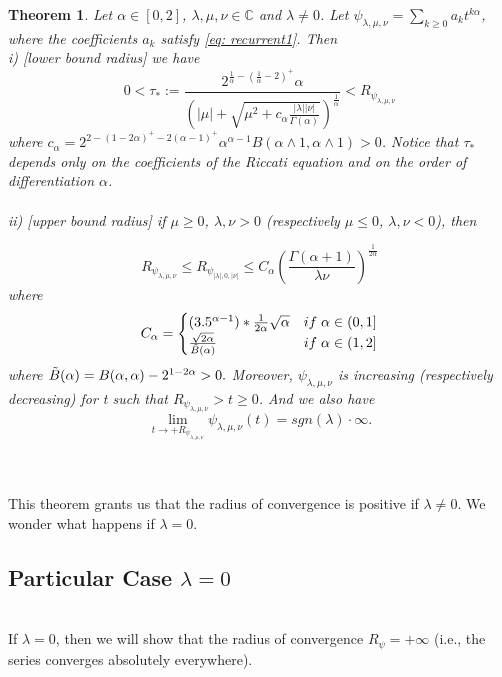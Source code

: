\documentclass[a4paper,italian,11pt]{book}
\newtheorem{theorem}{Theorem}
\theoremstyle{plain}
\theoremstyle{remark}
\theoremstyle{plain}
\begin{document}
\begin{theorem}\label{th: importantTheorem}
Let $\alpha \in [0,2]$, $\lambda, \mu, \nu \in \mathbb{C}$ and $\lambda \ne 0$. Let $\psi_{\lambda, \mu , \nu} = \sum_{k\ge 0} a_k t^{k\alpha}$, where the coefficients $a_k$ satisfy \eqref{eq: recurrent1}. Then
\\
i) [lower bound radius] we have
\begin{equation}
    \label{eq: 22inThePaper}
     0< \tau_* := \frac{2^{\frac{1}{\alpha} - (\frac{1}{\alpha} - 2)^+}\alpha}{\left( |\mu|  +\sqrt{\mu^2 + c_\alpha \frac{|\lambda||\nu|}{\Gamma(\alpha)}}\right) ^\frac{1}{\alpha} } < R_{\psi_{\lambda, \mu, \nu}}
\end{equation}
where $c_\alpha = 2^{2-(1-2\alpha)^+ - 2(\alpha -1)^+}\alpha ^{\alpha-1} B(\alpha \wedge 1, \alpha \wedge 1) >0$. Notice that $\tau_{*}$ depends only on the coefficients of the Riccati equation and on the order of differentiation $\alpha$.
\\
\\
ii) [upper bound radius] 
if $\mu \ge 0$, $\lambda,\nu >0$ (respectively $\mu \le 0$, $\lambda,\nu <0$), then


    
$$ R_{\psi_{\lambda, \mu, \nu}} \le R_{\psi_{|\lambda|, 0, |\nu|}}  \le C_\alpha \left( \frac{\Gamma(\alpha+1)}{\lambda \nu}\right) ^ \frac{1}{2\alpha}$$
where
$$C_\alpha = \begin{cases}
(3.5^{\alpha-1})*\frac{1}{2\alpha}\sqrt{\alpha} & if \hspace{0.1cm} \alpha \in (0,1]
\\
\tfrac{\sqrt{2\alpha}}{\Tilde{B}(\alpha)} & if \hspace{0.1cm}  \alpha \in (1,2]
\end{cases} $$
where $\Tilde{B} (\alpha) = B(\alpha,\alpha) - 2^{1-2\alpha} >0. $ Moreover, $\psi_{\lambda, \mu, \nu}$ is increasing (respectively decreasing) for t such that $R_{\psi_{\lambda,\mu,\nu}}> t\ge 0$. And we also have 
$$\lim_{t\to +R_{\psi_{\lambda,\mu,\nu}}} \psi_{\lambda,\mu,\nu}(t) = sgn(\lambda) \cdot \infty.$$
\end{theorem}
\\\
\\
This theorem grants us that the radius of convergence is positive if $\lambda \ne 0$. 
We wonder what happens if $\lambda = 0$.

\subsection{Particular Case $\lambda = 0$}
\\
If $\lambda = 0$, then we will show that the radius of convergence $R_\psi = +\infty$ (i.e., the series converges absolutely everywhere).
\end{document}
